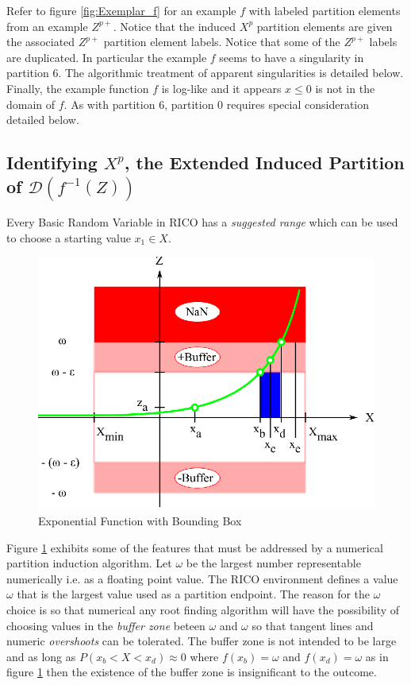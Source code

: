 Refer to figure \ref{fig:Exemplar_f} for an example $f$ with labeled partition elements from an example $Z^{p+}$. Notice that the induced $X^p$ partition elements are given the associated $Z^{p+}$ partition element labels. Notice that some of the $Z^{p+}$ labels are duplicated. In particular the example $f$ seems to have a singularity in partition $6$. The algorithmic treatment of apparent singularities is detailed below. Finally, the example function $f$ is log-like and it appears $x \le 0$ is not in the domain of $f$. As with partition $6$, partition $0$ requires special consideration detailed below.

\subsection{Identifying $X^p$, the Extended Induced Partition of $\mathcal{D}(f^{-1}(Z))$}

Every Basic Random Variable in RICO has a \emph{suggested range} which can be used to choose a starting value $x_1 \in X$. 

\begin{figure}
  \centering
  \includegraphics{Images/BoundExponential.eps}
  \caption[Exponential Function with Bounding Box]
          {Exponential Function with Bounding Box}
  \label{fig:BoundExponential}
\end{figure}

Figure \ref{fig:BoundExponential} exhibits some of the features that must be addressed by a numerical partition induction algorithm. Let $\omega$ be the largest number representable numerically i.e. as a floating point value. The RICO environment defines a value $\omega$ that is the largest value used as a partition endpoint. The reason for the $\omega$ choice is so that numerical any root finding algorithm will have the possibility of choosing values in the \emph{buffer zone} beteen $\omega$ and $\omega$ so that tangent lines and numeric \emph{overshoots} can be tolerated. The buffer zone is not intended to be large and as long as $P(x_b < X < x_d) \approx 0$ where $f(x_b) = \omega$ and $f(x_d) = \omega$ as in figure \ref{fig:BoundExponential} then the existence of the buffer zone is insignificant to the outcome.

